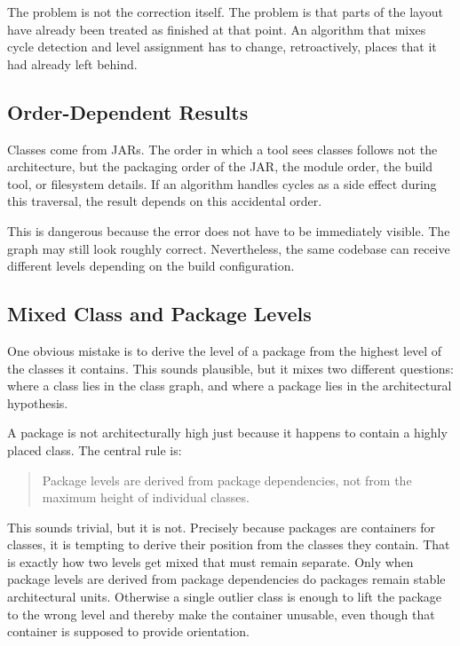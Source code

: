 \documentclass[a4paper,11pt]{article}
\begin{document}
The problem is not the correction itself. The problem is that parts of the
layout have already been treated as finished at that point. An algorithm that
mixes cycle detection and level assignment has to change, retroactively, places
that it had already left behind.

\subsection{Order-Dependent Results}

Classes come from JARs. The order in which a tool sees classes follows not the
architecture, but the packaging order of the JAR, the module order, the build
tool, or filesystem details. If an algorithm handles cycles as a side effect
during this traversal, the result depends on this accidental order.

This is dangerous because the error does not have to be immediately visible.
The graph may still look roughly correct. Nevertheless, the same codebase can
receive different levels depending on the build configuration.

\subsection{Mixed Class and Package Levels}

One obvious mistake is to derive the level of a package from the highest level
of the classes it contains. This sounds plausible, but it mixes two different
questions: where a class lies in the class graph, and where a package lies in
the architectural hypothesis.

A package is not architecturally high just because it happens to contain a
highly placed class. The central rule is:

\begin{quote}
  Package levels are derived from package dependencies, not from the maximum
  height of individual classes.
\end{quote}

This sounds trivial, but it is not. Precisely because packages are containers
for classes, it is tempting to derive their position from the classes they
contain. That is exactly how two levels get mixed that must remain separate.
Only when package levels are derived from package dependencies do packages
remain stable architectural units. Otherwise a single outlier class is enough
to lift the package to the wrong level and thereby make the container
unusable, even though that container is supposed to provide orientation.
\end{document}
